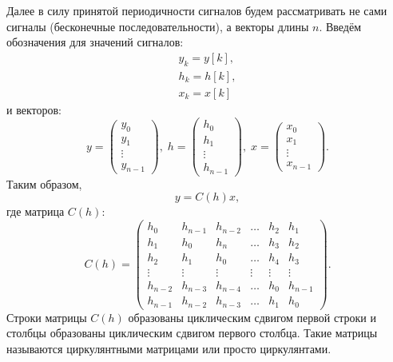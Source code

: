 Далее в силу принятой периодичности сигналов будем рассматривать не сами сигналы (бесконечные последовательности), а векторы длины $n$. Введём обозначения для значений сигналов:
\begin{gather*}
    y_k = y[k] , \\
    h_k = h[k] , \\
    x_k = x[k]
\end{gather*}
и векторов:
\[
    y
    = \begin{pmatrix}
          y_0    \\
          y_1    \\
          \vdots \\
          y_{n-1}
    \end{pmatrix}
    , \;
    h
    = \begin{pmatrix}
          h_0    \\
          h_1    \\
          \vdots \\
          h_{n-1}
    \end{pmatrix}
    , \;
    x
    = \begin{pmatrix}
          x_0    \\
          x_1    \\
          \vdots \\
          x_{n-1}
    \end{pmatrix}
    .
\]
Таким образом,
\begin{equation}
    \label{linear:transformation}
    y = C(h) x ,
\end{equation}
где матрица $C(h)$:
\begin{equation}
    \label{linear:circulant}
    C(h)
    = \begin{pmatrix}
          h_0     & h_{n-1} & h_{n-2} & \dots  & h_2    & h_1     \\
          h_1     & h_0     & h_{n}   & \dots  & h_3    & h_2     \\
          h_2     & h_1     & h_{0}   & \dots  & h_4    & h_3     \\
          \vdots  & \vdots  & \vdots  & \vdots & \vdots & \vdots  \\
          h_{n-2} & h_{n-3} & h_{n-4} & \dots  & h_0    & h_{n-1} \\
          h_{n-1} & h_{n-2} & h_{n-3} & \dots  & h_1    & h_0
    \end{pmatrix}
    .
\end{equation}
Строки матрицы $C(h)$ образованы циклическим сдвигом первой строки и столбцы образованы циклическим сдвигом первого столбца. Такие матрицы называются циркулянтными матрицами или просто
циркулянтами.

